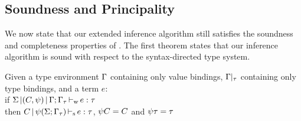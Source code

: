 



\subsection{Soundness and Principality}

We now state that our extended inference algorithm still satisfies the soundness
and completeness properties of \hmx.
%
The first theorem states that our inference algorithm is sound
with respect to the syntax-directed type system.

\begin{theorem}
  Given a type environment $\Gamma$ containing only value bindings,
  $\Gamma|_\tau$ containing only type bindings, and a term $e$:\\
  if $\Sigma \operatorname{|} (C,\mathrm{\psi}) \operatorname{|} \Gamma;\Gamma_\tau \operatorname{\vdash_w} e : \tau$\\
  then $C \operatorname{|} \mathrm{\psi}(\Sigma;\Gamma_\tau) \operatorname{\vdash_s} e : \tau$, $\mathrm{\psi} C = C$ and $\mathrm{\psi} \tau = \tau$
\end{theorem}

